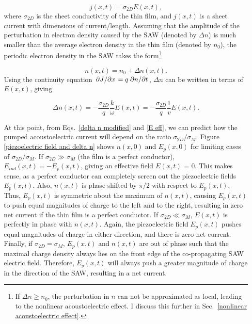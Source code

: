 \documentclass{beavtex_dub_edit}
\begin{document}
\begin{equation}
    j(x,t) = \sigma_{2D} E(x,t), \label{2D AE ohm's law}
\end{equation}
where $\sigma_{2D}$ is the sheet conductivity of the thin film, and $j(x,t)$ is a sheet current with dimensions of current/length. Assuming that the amplitude of the perturbation in electron density caused by the SAW (denoted by $\Delta n$) is much smaller than the average electron density in the thin film (denoted by $n_0$), the periodic electron density in the SAW takes the form\footnote{If $\Delta n \geq n_0$, the perturbation in $n$ can not be approximated as local, leading to the nonlinear acoustoelectric effect. I discuss this further in Sec.\ \ref{nonlinear acoustoelectric effect}.}

\begin{equation}
    n(x,t) = n_0 + \Delta n(x,t). 
\end{equation}
Using the continuity equation $\pdv*{J}{x} = q \pdv*{n}{t}$, $\Delta n$ can be written in terms of $E(x,t)$, giving

\begin{equation}
    \Delta n(x,t) = -\frac{\sigma_{2D}}{q} \frac{k}{\omega} E(x,t) = -\frac{\sigma_{2D}}{q} \frac{1}{v}E(x,t). \label{delta n modified}
\end{equation}

At this point, from Eqs.\ \ref{delta n modified} and \ref{E eff}, we can predict how the pumped acoustoelectric current will depend on the ratio $\sigma_{2D}/\sigma_M$. Figure \ref{piezoelectric field and delta n} shows $n(x,0)$ and $E_p(x,0)$ for limiting cases of $\sigma_{2D}/\sigma_M$. If $\sigma_{2D} \gg \sigma_M$ (the film is a perfect conductor), $E_{ind}(x,t) = -E_p(x,t)$, giving an effective field $E(x,t)$ = 0. This makes sense, as a perfect conductor can completely screen out the piezoelectric fields $E_p(x,t)$. Also, $n(x,t)$ is phase shifted by $\pi/2$ with respect to $E_p(x,t)$. Thus, $E_p(x,t)$ is symmetric about the maximum of $n(x,t)$, causing $E_p(x,t)$ to push equal magnitudes of charge to the left and to the right, resulting in zero net current if the thin film is a perfect conductor. If $\sigma_{2D} \ll \sigma_M$, $E(x,t)$ is perfectly in phase with $n(x,t)$. Again, the piezoelectric field $E_p(x,t)$ pushes equal magnitudes of charge in either direction, and there is zero net current. Finally, if $\sigma_{2D} = \sigma_M$, $E_p(x,t)$ and $n(x,t)$ are out of phase such that the maximal charge density always lies on the front edge of the co-propagating SAW electric field. Therefore, $E_p(x,t)$ will always push a greater magnitude of charge in the direction of the SAW, resulting in a net current.
\end{document}
